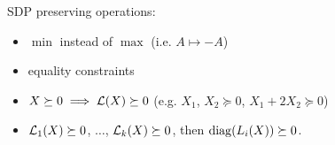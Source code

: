 SDP preserving operations:
\begin{itemize}
    \item $\min$ instead of $\max$ (i.e. $A \mapsto -A$)
    \item equality constraints
    \item $X \succeq 0 \implies \mathcal{L}(X) \succeq 0$
        (e.g. $X_1$, $X_2 \succeq 0$, $X_1 + 2 X_2 \succeq 0$)
    \item $\mathcal{L}_1(X) \succeq 0$, $\ldots$, $\mathcal{L}_k(X) \succeq 0$,
        then $\operatorname{diag}(L_i(X)) \succeq 0$.
\end{itemize}
